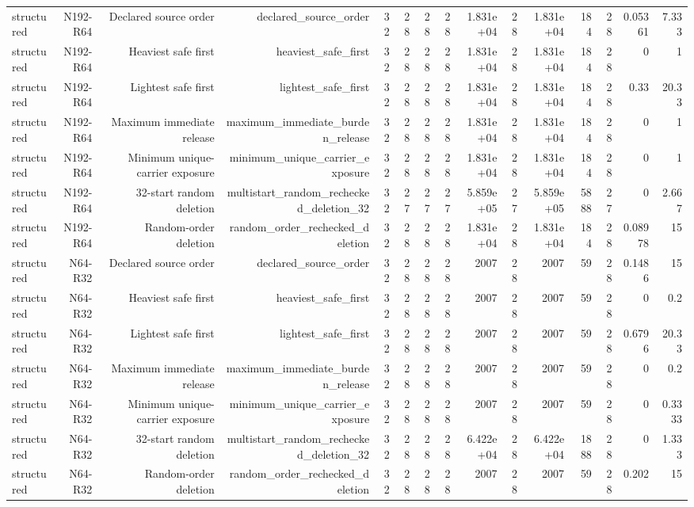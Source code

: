 {\begin{longtable}{lrrrrrrrrrrrrrr}
structured & N192-R64 & Declared source order & declared\_source\_order & 32 & 28 & 28 & 28 & 1.831e+04 & 28 & 1.831e+04 & 184 & 28 & 0.05361 & 7.333 \\
structured & N192-R64 & Heaviest safe first & heaviest\_safe\_first & 32 & 28 & 28 & 28 & 1.831e+04 & 28 & 1.831e+04 & 184 & 28 & 0 & 1 \\
structured & N192-R64 & Lightest safe first & lightest\_safe\_first & 32 & 28 & 28 & 28 & 1.831e+04 & 28 & 1.831e+04 & 184 & 28 & 0.33 & 20.33 \\
structured & N192-R64 & Maximum immediate release & maximum\_immediate\_burden\_release & 32 & 28 & 28 & 28 & 1.831e+04 & 28 & 1.831e+04 & 184 & 28 & 0 & 1 \\
structured & N192-R64 & Minimum unique-carrier exposure & minimum\_unique\_carrier\_exposure & 32 & 28 & 28 & 28 & 1.831e+04 & 28 & 1.831e+04 & 184 & 28 & 0 & 1 \\
structured & N192-R64 & 32-start random deletion & multistart\_random\_rechecked\_deletion\_32 & 32 & 27 & 27 & 27 & 5.859e+05 & 27 & 5.859e+05 & 5888 & 27 & 0 & 2.667 \\
structured & N192-R64 & Random-order deletion & random\_order\_rechecked\_deletion & 32 & 28 & 28 & 28 & 1.831e+04 & 28 & 1.831e+04 & 184 & 28 & 0.08978 & 15 \\
structured & N64-R32 & Declared source order & declared\_source\_order & 32 & 28 & 28 & 28 & 2007 & 28 & 2007 & 59 & 28 & 0.1486 & 15 \\
structured & N64-R32 & Heaviest safe first & heaviest\_safe\_first & 32 & 28 & 28 & 28 & 2007 & 28 & 2007 & 59 & 28 & 0 & 0.2 \\
structured & N64-R32 & Lightest safe first & lightest\_safe\_first & 32 & 28 & 28 & 28 & 2007 & 28 & 2007 & 59 & 28 & 0.6796 & 20.33 \\
structured & N64-R32 & Maximum immediate release & maximum\_immediate\_burden\_release & 32 & 28 & 28 & 28 & 2007 & 28 & 2007 & 59 & 28 & 0 & 0.2 \\
structured & N64-R32 & Minimum unique-carrier exposure & minimum\_unique\_carrier\_exposure & 32 & 28 & 28 & 28 & 2007 & 28 & 2007 & 59 & 28 & 0 & 0.3333 \\
structured & N64-R32 & 32-start random deletion & multistart\_random\_rechecked\_deletion\_32 & 32 & 28 & 28 & 28 & 6.422e+04 & 28 & 6.422e+04 & 1888 & 28 & 0 & 1.333 \\
structured & N64-R32 & Random-order deletion & random\_order\_rechecked\_deletion & 32 & 28 & 28 & 28 & 2007 & 28 & 2007 & 59 & 28 & 0.202 & 15 \\

\end{longtable}}
